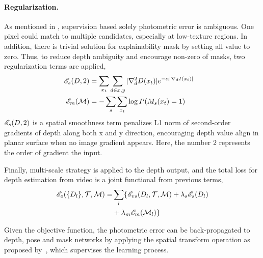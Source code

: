 \paragraph{Regularization.} 
As mentioned in , supervision based solely photometric error is ambiguous. One pixel could match to multiple candidates, especially at low-texture regions. In addition, there is trivial solution for explainability mask by setting all value to zero. Thus, to reduce depth ambiguity and encourage non-zero of masks, two regularization terms are applied, 
\begin{align}
\small
\label{eqn:regular}
\scr{E}_{s}(D, 2) &= \sum_{x_t}\sum_{d \in {x, y}}|\nabla^{2}_dD(x_t)|e^{-\alpha|\nabla_dI(x_t)|} & \nonumber \\
\scr{E}_{m}(\hua{M}) &= -\sum_s\sum_{x_t}\log P(M_s(x_t) = 1) &
\end{align}
${\mathscr E}_{s}(D, 2)$ is a spatial smoothness term penalizes L1 norm of second-order gradients of depth along both x and y direction, encouraging depth value align in planar surface when no image gradient appears. Here, the number $2$ represents the order of gradient \wrt the input.

Finally, multi-scale strategy is applied to the depth output, and the total loss for depth estimation from video is a joint functional from previous terms,
\begin{align}
\small
\label{eqn:full}
\scr{E}_{o}(\{D_l\}, \hua{T}, \hua{M}) =& \sum_l\{\scr{E}_{vs}(D_l,\hua{T},\hua{M}) + \lambda_s\scr{E}_{s}(D_l) \nonumber\\
&+ \lambda_m\scr{E}_{m}(\hua{M}_l)\}
\end{align}

Given the objective function, the photometric error can be back-propagated to depth, pose and mask networks by applying the spatial transform operation as proposed by~\cite{jaderberg2015spatial}, which supervises the learning process.

